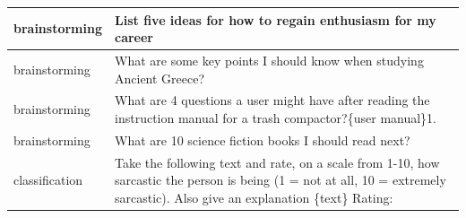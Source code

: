 \documentclass{article}
\begin{document}
\begin{longtable}{p{} p{}}
\bottomrule
\endlastfoot
 brainstorming &                                                                                                                                                                                                                                                                                                                                                                   List five ideas for how to regain enthusiasm for my career \\ \midrule
 brainstorming &                                                                                                                                                                                                                                                                                                                                                         What are some key points I should know when studying Ancient Greece? \\ \midrule
 brainstorming &                                                                                                                                                                                                                                                                                                    What are 4 questions a user might have after reading the instruction manual for a trash compactor?{\newline}{\newline}\{user manual\}{\newline}{\newline}1. \\ \midrule
 brainstorming &                                                                                                                                                                                                                                                                                                                                                                        What are 10 science fiction books I should read next? \\ \midrule
classification &                                                                                                                                                                                                                                  Take the following text and rate, on a scale from 1-10, how sarcastic the person is being (1 = not at all, 10 = extremely sarcastic). Also give an explanation{\newline} {\newline}{\newline} \{text\}{\newline} {\newline}{\newline} Rating: \\ \midrule

\end{longtable}
\end{document}
